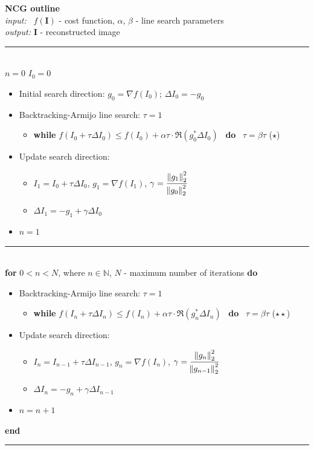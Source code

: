 \noindent \begin{samepage} \textbf{NCG outline} \\
\indent \qquad \qquad \textit{input:} \, $f(\mathbf{I})$ - cost function, $\alpha$, $\beta$ - line search parameters\\ 
\indent \qquad \qquad \textit{output:} $\mathbf{I}$ - reconstructed image\\
\noindent\rule{15cm}{0.4pt} \\
$n=0$ \quad $I_0 = 0$ 
\begin{itemize}
	\item Initial search direction: $g_0 = \nabla f(I_0)$; $\Delta I_0 = -g_0$
	\item Backtracking-Armijo line search: $\tau = 1$
		\begin{itemize}
			\item \textbf{while} \quad $f(I_0 + \tau \Delta I_0) \leq f(I_0) + \alpha \tau \cdot \Re(g^*_0 \Delta I_0)$ \, \textbf{do} \, $\tau = \beta \tau$ \quad ($\star$)
		\end{itemize}
	\item Update search direction:
		\begin{itemize}
			\item $I_1 = I_0 + \tau \Delta I_0$, $g_1 = \nabla f(I_1)$, $\gamma = \cfrac{\norm{g_1}^2_2}{\norm{g_0}^2_2}$
			\item $\Delta I_1 = -g_1 + \gamma \Delta I_0$
		\end{itemize}
	\item $n=1$ 
\end{itemize} \vspace{-3mm} \noindent\rule{15cm}{0.4pt} \\
\textbf{for} \quad $0<n<N$, where $n \in \mathbb{N}$, $N$ - maximum number of iterations \quad \textbf{do}
\begin{itemize}
	\item Backtracking-Armijo line search: 	$\tau = 1$
		\begin{itemize}
			\item \textbf{while} \quad $f(I_{n} + \tau \Delta I_{n}) \leq f(I_{n}) + \alpha \tau \cdot \Re(g^*_{n} \Delta I_{n})$  \, \textbf{do} \, $\tau = \beta \tau$ \quad ($\star\star$)
		\end{itemize}
	\item Update search direction:
		\begin{itemize}
			\item $I_n = I_{n-1} + \tau \Delta I_{n-1}$, $g_n = \nabla f(I_n)$, $\gamma = \cfrac{\norm{g_n}^2_2}{\norm{g_{n-1}}^2_2}$
			\item $\Delta I_n = -g_n + \gamma \Delta I_{n-1}$
		\end{itemize}
	\item $n=n+1$ 
\end{itemize}
\textbf{end} \\
\noindent\rule{15cm}{0.4pt}
\end{samepage}\\
